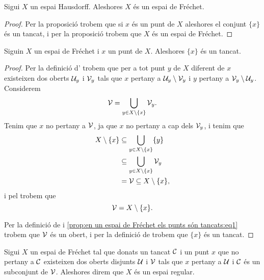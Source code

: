 \documentclass[../../Main.tex]{subfiles}
\begin{document}
	\begin{corollary}
		\label{cor:els espais Hausdorff són Fréchet}
		Sigui \(X\) un espai Hausdorff. Aleshores \(X\) és un espai de Fréchet.
		\begin{proof}
			Per la proposició  trobem que si \(x\) és un punt de \(X\) aleshores el conjunt \(\{x\}\) és un tancat, i per la proposició  trobem que \(X\) és un espai de Fréchet.
		\end{proof}
	\end{corollary}
	\begin{proposition}
		\label{prop:en un espai de Fréchet els punts són tancats}
		Siguin \(X\) un espai de Fréchet i \(x\) un punt de \(X\). Aleshores \(\{x\}\) és un tancat.
		\begin{proof}
			Per la definició d' trobem que per a tot punt \(y\) de \(X\) diferent de \(x\) existeixen dos oberts \(\mathcal{U}_{y}\) i \(\mathcal{V}_{y}\) tals que \(x\) pertany a \(\mathcal{U}_{y}\setminus\mathcal{V}_{y}\) i \(y\) pertany a \(\mathcal{V}_{y}\setminus\mathcal{U}_{y}\). Considerem
			\begin{equation}
				\label{prop:en un espai de Fréchet els punts són tancats:eq1}
				\mathcal{V}=\bigcup_{y\in X\setminus\{x\}}\mathcal{V}_{y}.
			\end{equation}
			Tenim que \(x\) no pertany a \(\mathcal{V}\), ja que \(x\) no pertany a cap dels \(\mathcal{V}_{y}\), i tenim que
			\begin{align*}
				X\setminus\{x\}&\subseteq\bigcup_{y\in X\setminus\{x\}}\{y\} \\
				&\subseteq\bigcup_{y\in X\setminus\{x\}}\mathcal{V}_{y}\\
				&=\mathcal{V}\subseteq X\setminus\{x\},
			\end{align*}
			i pel  trobem que
			\[
			    \mathcal{V}=X\setminus\{x\}.
			\]
			
			Per la definició de  i \eqref{prop:en un espai de Fréchet els punts són tancats:eq1} trobem que \(\mathcal{V}\) és un obert, i per la definició de   trobem que \(\{x\}\) és un tancat.
		\end{proof}
	\end{proposition}
	\begin{definition}
		\label{def:espai regular}
		Sigui \(X\) un espai de Fréchet tal que donats un tancat \(\mathcal{C}\) i un punt \(x\) que no pertany a \(\mathcal{C}\) existeixen dos oberts disjunts \(\mathcal{U}\) i \(\mathcal{V}\) tals que \(x\) pertany a \(\mathcal{U}\) i \(\mathcal{C}\) és un subconjunt de \(\mathcal{V}\). Aleshores direm que \(X\) és un espai regular.
	\end{definition}
\end{document}
